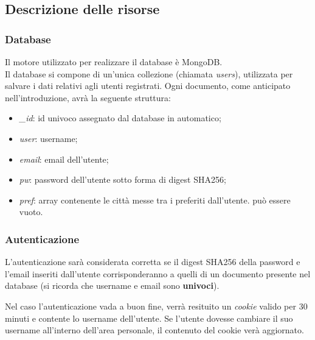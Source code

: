 \subsection{Descrizione delle risorse}

\subsubsection{Database}

Il motore utilizzato per realizzare il database è MongoDB.\\
Il database si compone di un'unica collezione (chiamata \emph{users}), utilizzata per salvare i dati relativi agli utenti registrati. 
Ogni documento, come anticipato nell'introduzione, avrà la seguente struttura:
\begin{itemize}
    \item \emph{\_id}: id univoco assegnato dal database in automatico;
    \item \emph{user}: username;
    \item \emph{email}: email dell'utente;
    \item \emph{pw}: password dell'utente sotto forma di digest SHA256;
    \item \emph{pref}: array contenente le città messe tra i preferiti dall'utente. può essere vuoto.
\end{itemize}

\subsubsection{Autenticazione}

L'autenticazione sarà considerata corretta se il digest SHA256 della password e l'email inseriti dall'utente corrisponderanno 
a quelli di un documento presente nel database (si ricorda che username e email sono \textbf{univoci}).

\vspace{5mm}

Nel caso l'autenticazione vada a buon fine, verrà resituito un \emph{cookie} valido per 30 minuti e contente lo username dell'utente. 
Se l'utente dovesse cambiare il suo username all'interno dell'area personale, il contenuto del cookie verà aggiornato. 